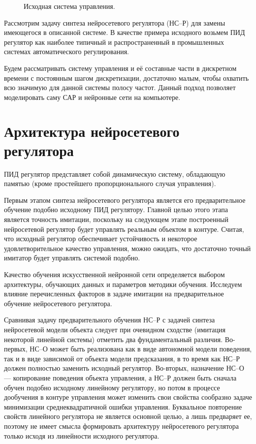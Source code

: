 \begin{figure}[h]
  \centering
  
  \caption{Исходная система управления.}
  \label{fig:ctrlloop}
\end{figure}

Рассмотрим задачу синтеза нейросетевого регулятора (НС--Р) для замены
имеющегося в описанной системе.  В качестве примера исходного возьмем
ПИД регулятор как наиболее типичный и распространенный в промышленных
системах автоматического регулирования.

Будем рассматривать систему управления и её составные части в
дискретном времени с постоянным шагом дискретизации, достаточно малым,
чтобы охватить всю значимую для данной системы полосу частот.  Данный
подход позволяет моделировать саму САР и нейронные сети на компьютере.

\section{Архитектура нейросетевого регулятора}


ПИД регулятор представляет собой динамическую систему, обладающую
памятью (кроме простейшего пропорционального случая управления).

Первым этапом синтеза нейросетевого регулятора является его
предварительное обучение подобно исходному ПИД регулятору.  Главной
целью этого этапа является точность имитации, поскольку на следующем
этапе построенный нейросетевой регулятор будет управлять реальным
объектом в контуре.  Считая, что исходный регулятор обеспечивает
устойчивость и некоторое удовлетворительное качество управления, можно
ожидать, что достаточно точный имитатор будет управлять системой
подобно.

Качество обучения искусственной нейронной сети определяется выбором
архитектуры, обучающих данных и параметров методики обучения.
Исследуем влияние перечисленных факторов в задаче имитации  на предварительное обучение
нейросетевого регулятора.

Сравнивая задачу предварительного обучения НС--Р с задачей синтеза
нейросетевой модели объекта следует при очевидном сходстве (имитация
некоторой линейной системы) отметить два фундаментальный различия.
Во-первых, НС--О может быть реализована как в виде автономной модели
поведения, так и в виде зависимой от объекта модели предсказания, в то
время как НС--Р должен полностью заменить исходный регулятор.
Во-вторых, назначение НС--О --- копирование поведения объекта
управления, а НС--Р должен быть сначала обучен подобно исходному
линейному регулятору, но потом в процессе дообучения в контуре
управления может изменить свои свойства сообразно задаче минимизации
среднеквадратичной ошибки управления.  Буквальное повторение свойств
линейного регулятора не является основной целью, а лишь предваряет ее,
поэтому не имеет смысла формировать архитектуру нейросетевого
регулятора только исходя из линейности исходного регулятора.

